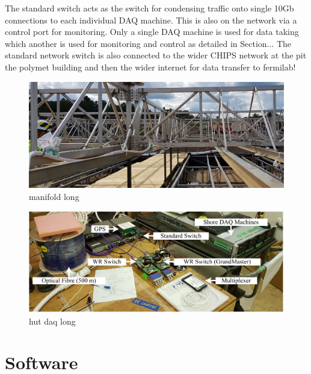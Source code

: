 The standard switch acts as the switch for condensing traffic onto single 10Gb connections to each
individual DAQ machine. This is also on the network via a control port for monitoring. Only a
single DAQ machine is used for data taking which another is used for monitoring and control as
detailed in Section... The standard network switch is also connected to the wider CHIPS network at
the pit the polymet building and then the wider internet for data transfer to fermilab!

\begin{figure} %
    \includegraphics[width=\textwidth]{diagrams/5-daq/manifold.jpg}
    \caption[manifold short]
    {manifold long}
    \label{fig:manifold}
\end{figure}

\begin{figure} %
    \includegraphics[width=\textwidth]{diagrams/5-daq/hut_daq.pdf}
    \caption[hut daq short]
    {hut daq long}
    \label{fig:hut_daq}
\end{figure}

\section{Software} %
\label{sec:daq_soft} %

